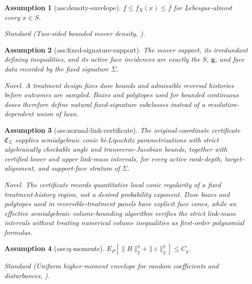 \documentclass{article}
\newtheorem{assumption}{Assumption}
\begin{document}
\begin{assumption}[ass:density-envelope]\label{ass:density-envelope}
\(\underline f\le f_X(x)\le\overline f\) for Lebesgue-almost every \(x\in S\).
\par\smallskip\noindent\emph{Standard} (Two-sided bounded mover density, \cite{GrahamPowell2012}).
\end{assumption}

\begin{assumption}[ass:fixed-signature-support]\label{ass:fixed-signature-support}
The mover support, its irredundant defining inequalities, and its active face incidences are exactly the \(S\), \(\mathbf g\), and face data recorded by the fixed signature \(\Sigma\).
\par\smallskip\noindent\emph{Novel.} A treatment design fixes dose bounds and admissible reversal histories before outcomes are sampled. Boxes and polytopes used for bounded continuous doses therefore define natural fixed-signature subclasses instead of a resolution-dependent union of laws.
\end{assumption}

\begin{assumption}[ass:normal-link-certificate]\label{ass:normal-link-certificate}
The original-coordinate certificate \(\mathfrak C_\Sigma\) supplies semialgebraic conic bi-Lipschitz parametrizations with strict algebraically checkable angle and transverse-Jacobian bounds, together with certified lower and upper link-mass intervals, for every active rank-depth, target-alignment, and support-face stratum of \(\Sigma\).
\par\smallskip\noindent\emph{Novel.} The certificate records quantitative local conic regularity of a fixed treatment-history region, not a desired probability exponent. Dose boxes and polytopes used in reversible-treatment panels have explicit face cones, while an effective semialgebraic volume-bounding algorithm verifies the strict link-mass intervals without treating numerical volume inequalities as first-order polynomial formulas.
\end{assumption}

\begin{assumption}[ass:q-moments]\label{ass:q-moments}
\(E_P[\|B\|_2^q+\|\varepsilon\|_2^q]\le C_q\).
\par\smallskip\noindent\emph{Standard} (Uniform higher-moment envelope for random coefficients and disturbances, \cite{GrahamPowell2012}).
\end{assumption}
\end{document}
